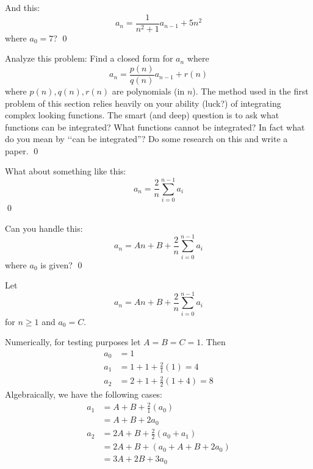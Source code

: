 \newpage
\begin{ex}
  And this:
  \[
  a_n = \frac{1}{n^2 + 1} a_{n - 1} + 5n^2
  \]
  where $a_0 = 7$?
  \qed
\end{ex}


\newpage
\begin{ex}
Analyze this problem:
Find a closed form for $a_n$ where
\[
a_n = \frac{p(n)}{q(n)} a_{n - 1} + r(n)
\]
where $p(n), q(n), r(n)$ are polynomials (in $n$).
The method used in the first problem of this section relies
heavily on your ability (luck?) of integrating complex looking functions.
The smart (and deep) question is to ask what functions can be integrated?
What functions cannot be integrated? In fact what do you mean by
\lq\lq can be integrated''?
Do some research on this and write a paper.
\qed
\end{ex}


\newpage
\begin{ex}
What about something like this:
\[
a_n = \frac{2}{n} \sum_{i=0}^{n-1} a_i 
\]
\qed
\end{ex}


\newpage
\begin{ex}
Can you handle this:
\[
a_n = An + B + \frac{2}{n} \sum_{i=0}^{n-1} a_i 
\]
where $a_0$ is given?
\qed
\end{ex}
  

\newpage
Let
\[
a_n = An + B + \frac{2}{n} \sum_{i=0}^{n-1} a_i
\]
for $n \geq 1$ 
and $a_0 = C$.

Numerically, for testing purposes let $A = B = C = 1$.
Then
\begin{align*}
a_0 &= 1 \\
a_1 &= 1 + 1 + \frac{2}{1} \left( 1 \right) = 4 \\
a_2 &= 2 + 1 + \frac{2}{2} \left( 1 + 4\right) = 8 
\end{align*}
Algebraically, we have the following cases:
\begin{align*}
  a_1
  &= A + B + \frac{2}{1} (a_0) \\
  &= A + B + 2a_0 \\
  a_2 &= 2A + B + \frac{2}{2}(a_0 + a_1)  \\
      &= 2A + B + (a_0 + A + B + 2 a_0) \\
      &= 3A + 2B + 3 a_0
\end{align*}

